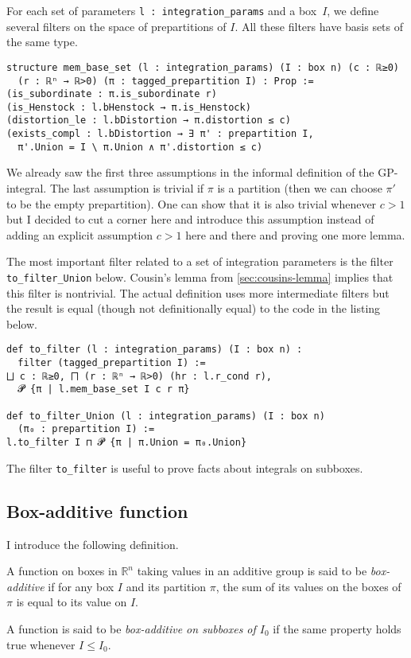 \documentclass[a4paper, UKenglish,cleveref, autoref, thm-restate]{lipics-v2021}
\newcommand{\bbR}{\mathbb{R}}
\begin{document}
For each set of parameters \lstinline=l : integration_params= and a
box~\(I\), we define several filters on the space of prepartitions of
\(I\). All these filters have basis sets of the same type.

\begin{lstlisting}
structure mem_base_set (l : integration_params) (I : box n) (c : ℝ≥0)
  (r : ℝⁿ → ℝ>0) (π : tagged_prepartition I) : Prop :=
(is_subordinate : π.is_subordinate r)
(is_Henstock : l.bHenstock → π.is_Henstock)
(distortion_le : l.bDistortion → π.distortion ≤ c)
(exists_compl : l.bDistortion → ∃ π' : prepartition I,
  π'.Union = I \ π.Union ∧ π'.distortion ≤ c)
\end{lstlisting}

We already saw the first three assumptions in the informal definition
of the GP-integral. The last assumption is trivial if \(\pi\) is a
partition (then we can choose \(\pi'\) to be the empty
prepartition). One can show that it is also trivial whenever \(c>1\)
but I decided to cut a corner here and introduce this assumption
instead of adding an explicit assumption \(c>1\) here and there and
proving one more lemma.

The most important filter related to a set of integration parameters
is the filter \lstinline=to_filter_Union= below. Cousin's lemma from
\autoref{sec:cousins-lemma} implies that this filter is
nontrivial. The actual definition uses more intermediate filters but
the result is equal (though not definitionally equal) to the code in
the listing below.

\begin{lstlisting}
def to_filter (l : integration_params) (I : box n) :
  filter (tagged_prepartition I) :=
⨆ c : ℝ≥0, ⨅ (r : ℝⁿ → ℝ>0) (hr : l.r_cond r),
  𝓟 {π | l.mem_base_set I c r π}

def to_filter_Union (l : integration_params) (I : box n)
  (π₀ : prepartition I) :=
l.to_filter I ⊓ 𝓟 {π | π.Union = π₀.Union}
\end{lstlisting}

The filter \lstinline=to_filter= is useful to prove facts about
integrals on subboxes.

\subsection{Box-additive function}%
\label{sec:box-addit-funct}

I introduce the following definition.

\begin{definition}
  A function on boxes in \(\bbR^{n}\) taking values in an additive
  group is said to be \emph{box-additive} if for any box \(I\) and its
  partition \(\pi\), the sum of its values on the boxes of \(\pi\) is
  equal to its value on \(I\).

  A function is said to be \emph{box-additive on subboxes of
    \(I_{0}\)} if the same property holds true whenever \(I\le I_{0}\).
\end{definition}
\end{document}

